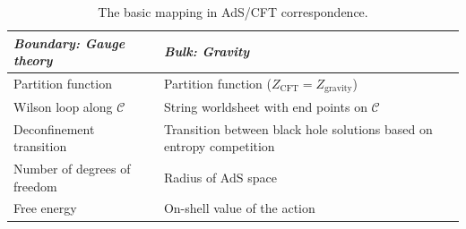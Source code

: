 \begin {table}[htbp] 
\begin{center}
\begin{tabular}{ |  p{5cm} |  p{8cm} |}
    \hline
    \emph{Boundary: Gauge theory}  & \emph{Bulk: Gravity }   \\ \hline \hline 
     Partition function   &  Partition function  ($Z_{\text{CFT}} = Z_{\text{gravity}}$) \\ \hline 
     Wilson loop along $\mathcal{C}$ & String worldsheet with end points on $\mathcal{C}$  \\ \hline 
     Deconfinement transition & Transition between black hole solutions based on entropy competition \\ \hline
     Number of degrees of freedom & Radius of AdS space  \\ \hline
     Free energy & On-shell value of the action  \\ \hline
\end{tabular}
\vspace{3mm}
\caption {\label{tab:dic1}The basic mapping in AdS/CFT correspondence.} 
\end{center}
\end {table}

